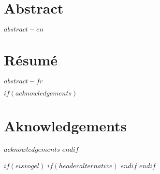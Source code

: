 



\cleardoublepage
\begin{minipage}{\linewidth}

\chapter*{Abstract}
$abstract-en$


\newpage
\chapter*{Résumé}
$abstract-fr$

\end{minipage}
\cleardoublepage



$if(acknowledgements)$
\chapter*{Aknowledgements}
$acknowledgements$
$endif$


\cleardoublepage

$if(eisvogel)$
\pagestyle{eisvogel-header-footer}
$if(headeralternative)$
\rhead[$date$]{\rightmark}
$endif$
$endif$

